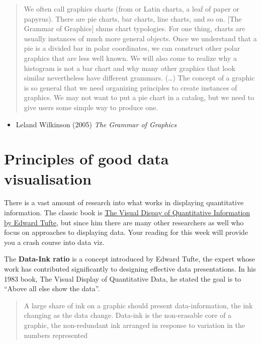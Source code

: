 \documentclass[]{book}
\providecommand{\tightlist}{%
  \setlength{\itemsep}{0pt}\setlength{\parskip}{0pt}}
\theoremstyle{definition}
\theoremstyle{definition}
\theoremstyle{definition}
\theoremstyle{remark}
\begin{document}
\begin{quote}
We often call graphics charts (from or Latin charta, a leaf of paper or
papyrus). There are pie charts, bar charts, line charts, and so on.
{[}The Grammar of Graphics{]} shuns chart typologies. For one thing,
charts are usually instances of much more general objects. Once we
understand that a pie is a divided bar in polar coordinates, we can
construct other polar graphics that are less well known. We will also
come to realize why a histogram is not a bar chart and why many other
graphics that look similar nevertheless have different grammars.
(\ldots{}) The concept of a graphic is so general that we need
organizing principles to create instances of graphics. We may not want
to put a pie chart in a catalog, but we need to give users some simple
way to produce one.
\end{quote}

\begin{itemize}
\tightlist
\item
  Leland Wilkinson (2005) \emph{The Grammar of Graphics}
\end{itemize}

\hypertarget{principles-of-good-data-visualisation}{%
\section{Principles of good data
visualisation}\label{principles-of-good-data-visualisation}}

There is a vast amount of research into what works in displaying
quantitative information. The classic book is
\href{https://www.edwardtufte.com/tufte/books_vdqi}{The Visual Dispay of
Quantitative Information by Edward Tufte}, but since him there are many
other researchers as well who focus on approaches to displaying data.
Your reading for this week will provide you a crash course into data
viz.~

The \textbf{Data-Ink ratio} is a concept introduced by Edward Tufte, the
expert whose work has contributed significantly to designing effective
data presentations. In his 1983 book, The Visual Display of Quantitative
Data, he stated the goal is to ``Above all else show the data''.

\begin{quote}
A large share of ink on a graphic should present data-information, the
ink changing as the data change. Data-ink is the non-erasable core of a
graphic, the non-redundant ink arranged in response to variation in the
numbers represented
\end{quote}
\end{document}

